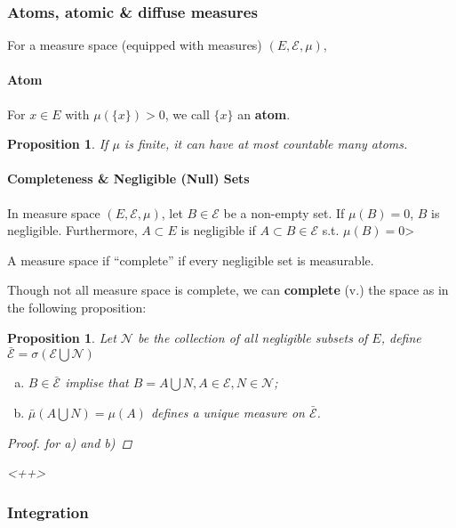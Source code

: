 \documentclass[11pt]{article}
\newcommand{\m}{\mathcal}
\newtheorem{proposition}[theorem]{Proposition}
\begin{document}
        \subsubsection{Atoms, atomic \& diffuse measures}
        For a measure space (equipped with measures) $(E, \m E, \mu)$, 

        \paragraph{Atom}
        For $x\in E$ with $\mu(\{x \}) > 0$, we call $\{x\}$ an \textbf{atom}.
        \begin{proposition}
          If $\mu$ is finite, it can have at most countable many atoms.
        \end{proposition}

        \paragraph{Completeness \& Negligible (Null) Sets}
        In measure space $(E, \m E, \mu)$, let $B \in\m E$ be  a non-empty set. If
        $\mu(B) = 0$, $B$ is negligible. Furthermore, $A \subset E$ is negligible if $A
        \subset B \in \m E$ s.t. $\mu(B) = 0$>

        A measure space if ``complete'' if every negligible set is measurable.

        Though not all measure space is complete, we can \textbf{complete} (v.) the
        space as in the following proposition: 
        \begin{proposition}
          Let $\m N$ be the collection of all negligible subsets of $E$, define $\bar {\m
          E} = \sigma (\m E \bigcup \m N)$
          \begin{enumerate}[a)]
            \item $B \in \bar { \m E }$ implise that $B  = A \bigcup N, A \in \m E, N
              \in \m N$;
            \item $\bar \mu (A \bigcup N) = \mu(A)$ defines a unique measure on $\bar {
              \m E}$. 
          \end{enumerate}
          \begin{proof}
            for a) and b)
          \end{proof}<++>
        \end{proposition}

        \subsubsection{Integration}
\end{document}
